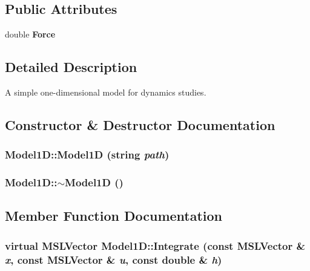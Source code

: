 \subsection*{Public Attributes}
\begin{CompactItemize}
\item 
double {\bf Force}
\end{CompactItemize}


\subsection{Detailed Description}
A simple one-dimensional model for dynamics studies.



\subsection{Constructor \& Destructor Documentation}
\subsubsection{\setlength{\rightskip}{0pt plus 5cm}Model1D::Model1D (string {\em path})}\label{class_Model1D_a0}


\subsubsection{\setlength{\rightskip}{0pt plus 5cm}Model1D::$\sim$Model1D ()\hspace{0.3cm}{\tt  [inline, virtual]}}\label{class_Model1D_a1}




\subsection{Member Function Documentation}
\subsubsection{\setlength{\rightskip}{0pt plus 5cm}virtual {\bf MSLVector} Model1D::Integrate (const {\bf MSLVector} \& {\em x}, const {\bf MSLVector} \& {\em u}, const double \& {\em h})\hspace{0.3cm}{\tt  [virtual]}}\label{class_Model1D_a3}


